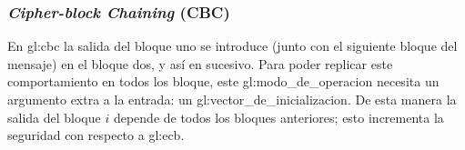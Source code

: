 %
%

\subsubsection{\textit{Cipher-block Chaining} (CBC)}
\label{sec:cbc}

En \gls{gl:cbc} la salida del bloque uno se introduce (junto con
el siguiente bloque del mensaje) en el bloque dos, y así en sucesivo.
Para poder replicar este comportamiento en todos los bloque, este
\gls{gl:modo_de_operacion} necesita un argumento extra a la entrada: un
\gls{gl:vector_de_inicializacion}. De esta manera la salida del bloque $ i $
depende de todos los bloques anteriores; esto incrementa la seguridad con
respecto a \gls{gl:ecb}.

